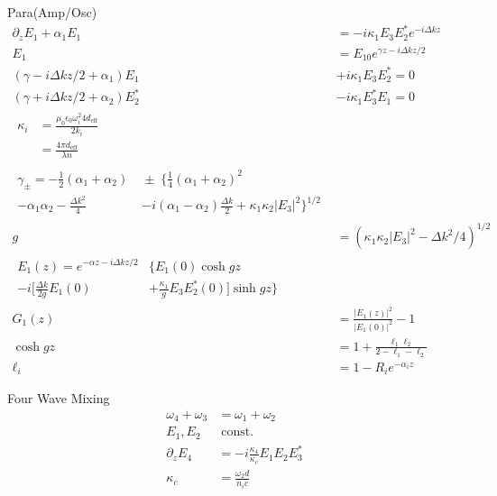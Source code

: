\documentclass[12pt]{article}
\begin{document}
\begin{multicols}{2}
  Para(Amp/Osc)
  \begin{align}
    \partial_z E_1 + \alpha_1 E_1 &= -i \kappa_1 E_3 E_2^* e^{-i\Delta k z}\\
    E_1 &= E_{10} e^{\gamma z - i \Delta k z / 2}\\
    (\gamma - i \Delta k z / 2 + \alpha_1) E_1 &+ i \kappa_1 E_3 E_2^* = 0\\
    (\gamma + i \Delta k z / 2 + \alpha_2) E_2^* &-i \kappa_1 E_3^* E_1 = 0\\
    \begin{split}
      \kappa_i {}&= \frac{\mu_0 \epsilon_0 \omega_i^2 4 d_{\textrm{eff}} }{2 k_i}\\
      &= \frac{4\pi d_{\textrm{eff}}}{\lambda n}
    \end{split}\\
    \begin{split}
      \gamma_\pm = -\frac{1}{2}(\alpha_1 + \alpha_2) \; &{}\pm \; \{\frac{1}{4}(\alpha_1 + \alpha_2)^2\\
      - \alpha_1\alpha_2 -\frac{\Delta k^2}{4} &-i(\alpha_1-\alpha_2)\frac{\Delta k}{2} + \kappa_1\kappa_2\lvert E_3\rvert^2\}^{1/2}
    \end{split}\\
    g &= (\kappa_1 \kappa_2 {\lvert E_3 \rvert}^2 - \Delta k^2 / 4)^{1/2}\\
    \begin{split}
      E_1(z) = e^{-\alpha z - i\Delta k z / 2} {}&\{E_1(0) \cosh gz \\
      - i[\frac{\Delta k}{2 g}E_1(0) &+ \frac{\kappa_1}{g} E_3 E_2^*(0)] \sinh gz\}
    \end{split}\\
    G_1(z) &= \frac{{\lvert E_1(z) \rvert}^2}{{\lvert E_1(0) \rvert}^2} - 1\\
    \cosh gz &= 1 + \frac{\ell_1 \ell_2}{2 - \ell_1 - \ell_2}\\
    \ell_i &= 1 - R_ie^{-\alpha_i z}
  \end{align}

  Four Wave Mixing
  \begin{align}
    \omega_4 + \omega_3 &= \omega_1 + \omega_2\\
    E_1, E_2 &\; \textrm{const.}\\
    \partial_z E_4 &= -i \frac{\kappa_4}{\kappa_c} E_1 E_2 E_3^*\\
    \kappa_c &= \frac{\omega_2 d}{n_i c}
  \end{align}


\end{multicols}
\end{document}
